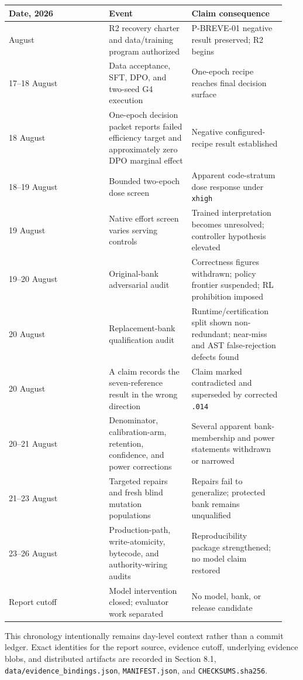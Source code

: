 \documentclass[
]{article}
\newcounter{none} %
\begin{document}
{\def\LTcaptype{none} %
\begin{longtable}[]{@{}p{0.34\linewidth}p{0.28\linewidth}p{0.32\linewidth}@{}}
\toprule\noalign{}
Date, 2026 & Event & Claim consequence \\
\midrule\noalign{}
\endhead
\bottomrule\noalign{}
\endlastfoot
17 August & R2 recovery charter and data/training program authorized &
P-BREVE-01 negative result preserved; R2 begins \\
17--18 August & Data acceptance, SFT, DPO, and two-seed G4 execution &
One-epoch recipe reaches final decision surface \\
18 August & One-epoch decision packet reports failed efficiency target
and approximately zero DPO marginal effect & Negative configured-recipe
result established \\
18--19 August & Bounded two-epoch dose screen & Apparent code-stratum
dose response under \texttt{xhigh} \\
19 August & Native effort screen varies serving controls & Trained
interpretation becomes unresolved; controller hypothesis elevated \\
19--20 August & Original-bank adversarial audit & Correctness figures
withdrawn; policy frontier suspended; RL prohibition imposed \\
20 August & Replacement-bank qualification audit & Runtime/certification
split shown non-redundant; near-miss and AST false-rejection defects
found \\
20 August & A claim records the seven-reference result in the wrong
direction & Claim marked contradicted and superseded by corrected
\texttt{.014} \\
20--21 August & Denominator, calibration-arm, retention, confidence, and
power corrections & Several apparent bank-membership and power
statements withdrawn or narrowed \\
21--23 August & Targeted repairs and fresh blind mutation populations &
Repairs fail to generalize; protected bank remains unqualified \\
23--26 August & Production-path, write-atomicity, bytecode, and
authority-wiring audits & Reproducibility package strengthened; no model
claim restored \\
Report cutoff & Model intervention closed; evaluator work separated & No
model, bank, or release candidate \\
\end{longtable}
}

This chronology intentionally remains day-level context rather than a
commit ledger. Exact identities for the report source, evidence cutoff,
underlying evidence blobs, and distributed artifacts are recorded in
Section 8.1, \texttt{data/evidence\_bindings.json},
\texttt{MANIFEST.json}, and \texttt{CHECKSUMS.sha256}.
\end{document}

